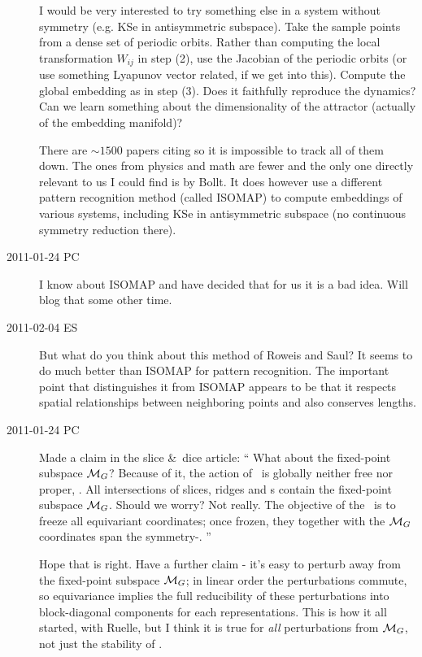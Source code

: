 \begin{description}
  I would be very interested to try something else in a system without symmetry
  (e.g. KSe in antisymmetric subspace). Take the sample points from a dense
  set of periodic orbits. Rather than computing the  local transformation
  $W_{ij}$ in step (2), use the Jacobian of the periodic orbits
  (or use something Lyapunov vector related, if we get into this).
  Compute the global embedding as in step (3). Does it faithfully reproduce
  the dynamics? Can we learn something about the dimensionality of
  the attractor (actually of the embedding manifold)?

  There are $\sim1500$ papers citing  so it is impossible to track
  all of them down. The ones from physics and math are fewer and the only one
  directly relevant to us I could find is by Bollt.
  It does however use a different pattern recognition method (called ISOMAP)
  to compute embeddings of various systems, including KSe in antisymmetric
  subspace (no continuous symmetry reduction there).

\item[2011-01-24 PC] I know about ISOMAP and have decided that for us
it is a bad idea. Will blog that some other time.

\item[2011-02-04 ES] But what do you think about this method of Roweis and
Saul? It seems to do much better than ISOMAP for pattern recognition.
The important point that distinguishes it from ISOMAP appears to be that
it respects spatial relationships between neighboring points and
also conserves lengths.

\item[2011-01-24 PC] Made a claim in the slice \&\ dice article:
``
What about the fixed-point subspace ${\cal M}_{G}$?
Because of it, the action of \Group\ is globally neither free nor proper,
\etc. All intersections of slices, ridges and {\chartBord s} contain the
fixed-point subspace ${\cal M}_{G}$. Should we worry? Not really. The
objective of the \mslices\ is to freeze all equivariant coordinates; once
frozen, they together with the  ${\cal M}_{G}$ coordinates span the
symmetry-\reducedsp.
''

Hope that is right. Have a further claim - it's easy to perturb away from
the fixed-point subspace ${\cal M}_{G}$; in linear order the perturbations
commute, so equivariance implies the full reducibility of these
perturbations into block-diagonal components for each representations.
This is how it all started, with Ruelle, but I think it is true
for \emph{all} perturbations from  ${\cal M}_{G}$, not just the stability
of \eqva.


\end{description}
